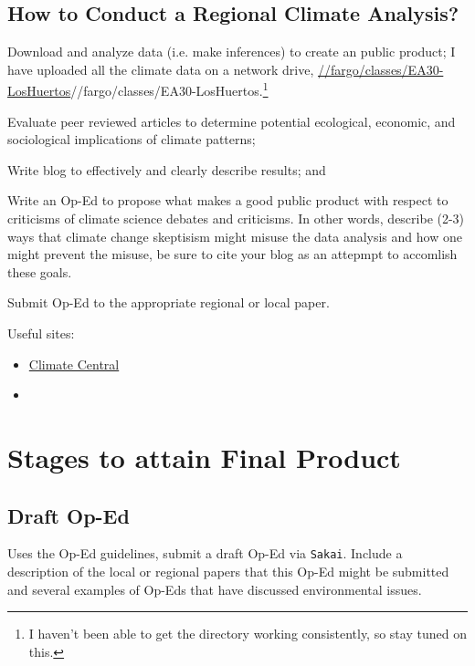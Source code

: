 \documentclass{article}\usepackage[]{graphicx}\usepackage[]{color}
\newenvironment{enumerate*}%
  {\begin{enumerate}%
    \setlength{\itemsep}{0pt}%
    \setlength{\parskip}{0pt}}%
  {\end{enumerate}}
\begin{document}
\subsection{How to Conduct a Regional Climate Analysis?}

\begin{enumerate*}

  \item Download and analyze data (i.e. make inferences) to create an public product; I have uploaded all the climate data on a network drive, \url{//fargo/classes/EA30-LosHuertos}{//fargo/classes/EA30-LosHuertos}.\footnote{I haven't been able to get the directory working consistently, so stay tuned on this.}
  
  \item Evaluate peer reviewed articles to determine potential ecological, economic, and sociological implications of climate patterns; 
  \item Write blog to effectively and clearly describe results; and
  \item Write an Op-Ed to propose what makes a good public product with respect to criticisms of climate science debates and criticisms. In other words, describe (2-3) ways that climate change skeptisism might misuse the data analysis and how one might prevent the misuse, be sure to cite your blog as an attepmpt to accomlish these goals. 
  \item Submit Op-Ed to the appropriate regional or local paper.
\end{enumerate*}

Useful sites: 

\begin{itemize}
  \item \href{http://www.climatecentral.org/news/the-heat-is-on}{Climate Central}
  \item 
\end{itemize}

\section{Stages to attain Final Product}

\subsection{Draft Op-Ed}

Uses the Op-Ed guidelines, submit a draft Op-Ed via \texttt{Sakai}. Include a description of the local or regional papers that this Op-Ed might be submitted and several examples of Op-Eds that have discussed environmental issues.
\end{document}
